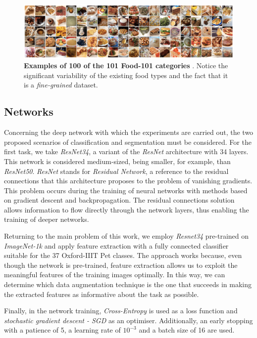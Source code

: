 \begin{figure}
    \centering
    \includegraphics[width=1\textwidth]{Pictures/food101.png} 
    \caption{\textbf{Examples of 100 of the 101 Food-101 categories} \cite{bossard14}. Notice the significant variability of the existing food types and the fact that it is a \textit{fine-grained} dataset.}
    \label{fig:food101}
\end{figure}

\subsection{Networks}
Concerning the deep network with which the experiments are carried out, the two proposed scenarios of classification and segmentation must be considered. For the first task, we take \textit{ResNet34}, a variant of the \textit{ResNet} architecture \cite{he2016deep} with 34 layers. This network is considered medium-sized, being smaller, for example, than \textit{ResNet50}. \textit{ResNet} stands for \textit{Residual Network}, a reference to the residual connections that this architecture proposes to the problem of vanishing gradients. This problem occurs during the training of neural networks with methods based on gradient descent and backpropagation. The residual connections solution allows information to flow directly through the network layers, thus enabling the training of deeper networks. 

Returning to the main problem of this work, we employ \textit{Resnet34} pre-trained on \textit{ImageNet-1k} and apply feature extraction with a fully connected classifier suitable for the 37 Oxford-IIIT Pet classes. The approach works because, even though the network is pre-trained, feature extraction allows us to exploit the meaningful features of the training images optimally. In this way, we can determine which data augmentation technique is the one that succeeds in making the extracted features as informative about the task as possible.

Finally, in the network training, \textit{Cross-Entropy} is used as a loss function and \textit{stochastic gradient descent - SGD} as an optimiser. Additionally, an early stopping with a patience of 5, a learning rate of $10^{-3}$ and a batch size of 16 are used.

